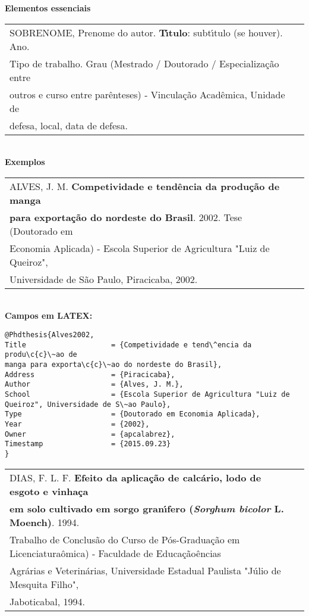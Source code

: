 \textbf{Elementos essenciais}\\

\begin{tabular}{|l|c|} \hline
	SOBRENOME, Prenome do autor. \textbf{T\'{\i}tulo}: subt\'{\i}tulo (se houver). Ano. \\ Tipo de trabalho. Grau (Mestrado / Doutorado / Especializa\c{c}\~ao entre \\ outros e curso entre par\^enteses) - Vincula\c{c}\~ao Acad\^emica, Unidade de \\ defesa, local, data de defesa.\\\hline
\end{tabular}\\

\textbf{Exemplos}\\

\begin{tabular}{|l|c|} \hline
	ALVES, J. M. \textbf{Competividade e tend\^encia da produ\c{c}\~ao de manga} \\ \textbf{para exporta\c{c}\~ao do nordeste do Brasil}. 2002. Tese (Doutorado em \\ Economia Aplicada) - Escola Superior de Agricultura "Luiz de Queiroz", \\ Universidade de S\~ao Paulo, Piracicaba, 2002.    \\\hline
\end{tabular} \\

\textbf{Campos em LATEX:}

\begin{verbatim}
@Phdthesis{Alves2002,
Title                    = {Competividade e tend\^encia da produ\c{c}\~ao de 
manga para exporta\c{c}\~ao do nordeste do Brasil},
Address                  = {Piracicaba},
Author                   = {Alves, J. M.},
School                   = {Escola Superior de Agricultura "Luiz de 
Queiroz", Universidade de S\~ao Paulo},
Type                     = {Doutorado em Economia Aplicada},
Year                     = {2002},
Owner                    = {apcalabrez},
Timestamp                = {2015.09.23}
}
\end{verbatim} 

\begin{tabular}{|l|c|} \hline
	DIAS, F. L. F. \textbf{Efeito da aplica\c{c}\~ao de calc\'ario, lodo de esgoto e vinha\c{c}a} \\ \textbf{em solo cultivado em sorgo gran\'{\i}fero (\textit{Sorghum bicolor} L. Moench)}. 1994. \\ Trabalho de Conclus\~ao do Curso de P\'os-Gradua\c{c}\~ao em Licenciatura\^omica) - Faculdade de Educa\c{c}\~ao\^encias\\  Agr\'arias e Veterin\'arias, Universidade Estadual Paulista "J\'ulio de Mesquita Filho", \\ Jaboticabal, 1994.     \\\hline
\end{tabular} \\

